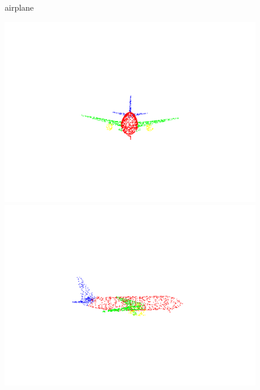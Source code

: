 \begin{figure}[htbp]
    \centering

    \begin{minipage}{0.1\textwidth}
        \centering
        {airplane}
    \end{minipage}
    \hfill
    \begin{minipage}{0.25\textwidth}
        \centering
        \includegraphics[width=\textwidth]{fig/supplement/part_segmentation/airplane/airplane00.pdf} %
    \end{minipage}
    \hfill
    \begin{minipage}{0.25\textwidth}
        \centering
        \includegraphics[width=\textwidth]{fig/supplement/part_segmentation/airplane/airplane01.pdf}

\end{minipage}
\end{figure}
